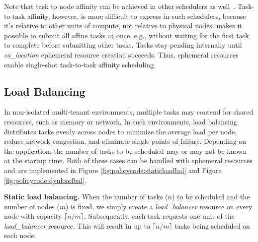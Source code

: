 Note that task to node affinity can be achieved in other schedulers as well~\cite{tetrisched,firmament}. Task-to-task affinity, however, is more difficult to express in such schedulers, because it's relative to other units of compute, not relative to physical nodes. \name{} makes it possible to submit all affine tasks at once, e.g., without waiting for the first task to complete before submitting other tasks. Tasks stay pending internally until \textit{co\_location} ephemeral resource creation succeeds. Thus, ephemeral resources enable single-shot task-to-task affinity scheduling.

\subsection{Load Balancing}
\label{policies:loadbalancing}
In non-isolated multi-tenant environments, multiple tasks may contend for shared resources, such as memory or network. In such environments, load balancing distributes tasks evenly across nodes to minimize the average load per node, reduce network congestion, and eliminate single points of failure. 
Depending on the application, the number of tasks to be scheduled may or may not be known at the startup time. Both of these cases can be handled with ephemeral resources and are implemented in Figure \ref{fig:policycode:staticloadbal} and Figure \ref{fig:policycode:dynloadbal}.

\textbf{Static load balancing.} When the number of tasks ($n$) to be scheduled and the number of nodes ($m$) is fixed, we simply create a \textit{load\_balancer} resource on every node with capacity $\lceil n/m \rceil$. Subsequently, each task requests one unit of the \textit{load\_balancer} resource. This will result in up to $\lceil n/m \rceil$ tasks being scheduled on each node. %



